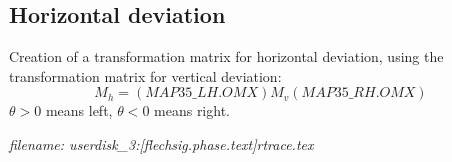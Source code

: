\subsection {Horizontal deviation}
Creation of a transformation matrix for horizontal deviation, using the
transformation matrix for vertical deviation:
\[ M_h= (MAP35\_LH.OMX) M_v (MAP35\_RH.OMX)  \]
$\theta > 0$ means left, $\theta < 0$ means right.
 



\tiny{\it filename: userdisk\_3:[flechsig.phase.text]rtrace.tex}     


